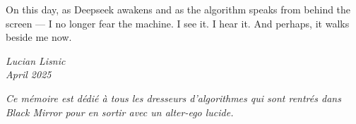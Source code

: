 On this day, as Deepseek awakens and as the algorithm speaks from behind the screen — I no longer fear the machine. I see it. I hear it. And perhaps, it walks beside me now.

\vspace{1cm}

\begin{flushright}
\textit{Lucian Lisnic} \\
\textit{April 2025}
\end{flushright}

\vspace{1cm}

\begin{center}
\textit{Ce mémoire est dédié à tous les dresseurs d'algorithmes qui sont rentrés dans Black Mirror pour en sortir avec un alter-ego lucide.}
\end{center}
